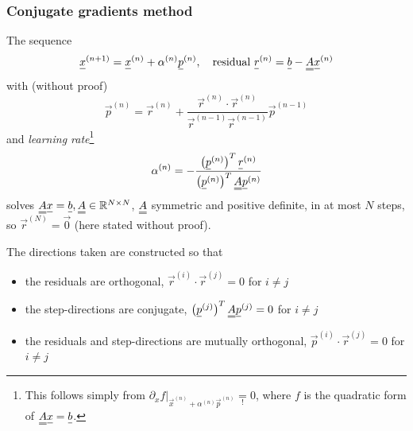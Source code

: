 \subsubsection{Conjugate gradients method}
The sequence
\begin{equation}
    \vec{x}^{(n+1)} = \vec{x}^{(n)} + \alpha^{(n)}\vec{p}^{(n)}, \quad \text{residual } \vec{r}^{(n)} = \vec{b} - \mat{A}\vec{x}^{(n)}
\end{equation}
with (without proof)
\begin{equation}
    \vec{p}^{(n)}=\vec{r}^{(n)}+\frac{\vec{r}^{(n)} \cdot \vec{r}^{(n)}}{\vec{r}^{(n-1)} \vec{r}^{(n-1)}} \vec{p}^{(n-1)}
\end{equation}
and \textit{learning rate}\footnote{This follows simply from $\left. \partial_x f \right|_{\vec{x}^{(n)} + \alpha^{(n)}\vec{p}^{(n)}} \underset{!}{=} 0$, where $f$ is the quadratic form of $\mat{A}\vec{x} = \vec{b}$.}
\begin{equation}
    \alpha^{(n)} = -\frac{\left(\vec{p}^{(n)} \right)^T \vec{r}^{(n)}}{\left(\vec{p}^{(n)} \right)^T \mat{A} \vec{p}^{(n)}}
\end{equation}
solves $\mat{A}\vec{x} = \vec{b}, \mat{A} \in \mathbb{R}^{N \times N}$, $\mat{A}$ symmetric
and positive definite, in at most $N$ steps, so $\vec{r}^{(N)} = \vec{0}$ (here stated without proof).

The directions taken are constructed so that
\begin{itemize}
    \item the residuals are orthogonal, $\vec{r}^{(i)} \cdot \vec{r}^{(j)} = 0$ for $i \ne j$
    \item the step-directions are conjugate, $\left(\vec{p}^{(j)} \right)^T \mat{A} \vec{p}^{(j)} = 0$ for $i \ne j$
    \item the residuals and step-directions are mutually orthogonal, $\vec{p}^{(i)} \cdot \vec{r}^{(j)} = 0$ for $i \ne j$
\end{itemize}

\pagebreak